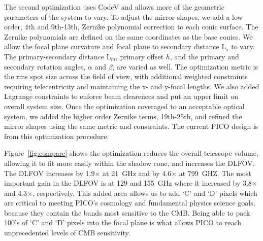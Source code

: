 \documentclass[]{spie}  %
\newcommand{\comr}[1]{\textcolor{red}{#1}}
\begin{document}
The second optimization uses CodeV and allows more of the geometric parameters of the system to vary. 
To adjust the mirror shapes, we add a low order, 
4th and 9th-13th, Zernike polynomial correction to each conic surface. The Zernike polynomials are defined on the same coordinates as the 
base conics.  We allow the focal plane curvature 
and focal plane to secondary distance L$_s$ to vary.  The primary-secondary distance L$_m$, primary offset $h$, and the primary and secondary 
rotation angles, $\alpha$ and $\beta$, are varied as well. The optimization metric is the rms spot size across the field of view, with 
additional weighted constraints requiring telecentricity and maintaining the x- and y-focal lengths.  We also added Lagrange constraints 
to enforce beam clearences and put an upper limit on overall system size.  Once the optimization coveraged to an acceptable optical 
system, we added the higher order Zernike terms, 19th-25th, and refined the mirror shapes using the same metric and constraints.
The current PICO design is from this optimization procedure.


Figure~\ref{fig:compare} 
shows the optimization reduces the overall telescope volume, allowing it to fit more easily within the shadow cone, and increases the DLFOV.  
The DLFOV increases by 1.9$\times$ at 21~GHz and by 4.6$\times$ at 799~GHZ. 
The most important gain in the DLFOV is at 129 and 155~GHz where it increased by 3.8$\times$ and 4.3$\times$, respectively.  
This added area allows us to add `C' and `D' pixels which are critical to meeting PICO's cosmology and fundamental 
physics science goals, because they contain the bands most sensitive to the CMB. Being able to pack 100's of `C' and `D' pixels into the focal 
plane is what allows PICO to reach unprecedented levels of CMB sensitivity.
\end{document}
